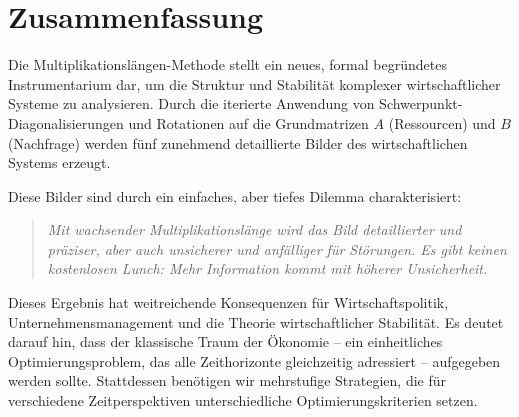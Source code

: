 \documentclass[a4paper,12pt]{article}
\theoremstyle{definition}
\begin{document}
\section{Zusammenfassung}

Die Multiplikationslängen-Methode stellt ein neues, formal begründetes Instrumentarium dar, um die Struktur und Stabilität komplexer wirtschaftlicher Systeme zu analysieren. Durch die iterierte Anwendung von Schwerpunkt-Diagonalisierungen und Rotationen auf die Grundmatrizen $A$ (Ressourcen) und $B$ (Nachfrage) werden fünf zunehmend detaillierte Bilder des wirtschaftlichen Systems erzeugt.

Diese Bilder sind durch ein einfaches, aber tiefes Dilemma charakterisiert:

\begin{quote}
\textit{Mit wachsender Multiplikationslänge wird das Bild detaillierter und präziser, aber auch unsicherer und anfälliger für Störungen. Es gibt keinen kostenlosen Lunch: Mehr Information kommt mit höherer Unsicherheit.}
\end{quote}

Dieses Ergebnis hat weitreichende Konsequenzen für Wirtschaftspolitik, Unternehmensmanagement und die Theorie wirtschaftlicher Stabilität. Es deutet darauf hin, dass der klassische Traum der Ökonomie – ein einheitliches Optimierungsproblem, das alle Zeithorizonte gleichzeitig adressiert – aufgegeben werden sollte. Stattdessen benötigen wir mehrstufige Strategien, die für verschiedene Zeitperspektiven unterschiedliche Optimierungskriterien setzen.
\end{document}
